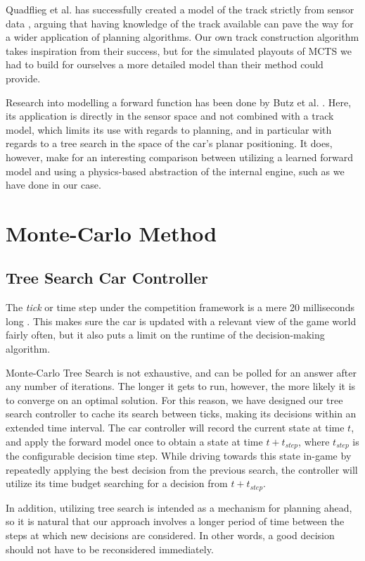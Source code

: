 \documentclass[conference]{IEEEtran}
\begin{document}
Quadflieg et al. has successfully created a model of the track strictly from sensor data \cite{trackmodel}, arguing that having knowledge of the track available can pave the way for a wider application of planning algorithms. Our own track construction algorithm takes inspiration from their success, but for the simulated playouts of MCTS we had to build for ourselves a more detailed model than their method could provide.

Research into modelling a forward function has been done by Butz et al. \cite{cobostar}. Here, its application is directly in the sensor space and not combined with a track model, which limits its use with regards to planning, and in particular with regards to a tree search in the space of the car’s planar positioning. It does, however, make for an interesting comparison between utilizing a learned forward model and using a physics-based abstraction of the internal engine, such as we have done in our case.

\section{Monte-Carlo Method}
\label{sec-method}
\subsection{Tree Search Car Controller}
The \emph{tick} or time step under the competition framework is a mere 20 milliseconds long \cite{manual}. This makes sure the car is updated with a relevant view of the game world fairly often, but it also puts a limit on the runtime of the decision-making algorithm.

Monte-Carlo Tree Search is not exhaustive, and can be polled for an answer after any number of iterations. The longer it gets to run, however, the more likely it is to converge on an optimal solution. For this reason, we have designed our tree search controller to cache its search between ticks, making its decisions within an extended time interval. The car controller will record the current state at time $t$, and apply the forward model once to obtain a state at time $t+t_{step}$, where $t_{step}$ is the configurable decision time step. While driving towards this state in-game by repeatedly applying the best decision from the previous search, the controller will utilize its time budget searching for a decision from $t+t_{step}$.

In addition, utilizing tree search is intended as a mechanism for planning ahead, so it is natural that our approach involves a longer period of time between the steps at which new decisions are considered. In other words, a good decision should not have to be reconsidered immediately.
\end{document}
